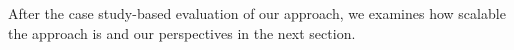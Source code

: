 
	
	

After the case study-based evaluation of our approach, we examines how scalable the approach is and our perspectives in the next section. 
